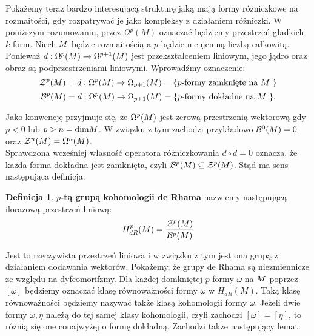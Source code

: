 \documentclass[licencjacka]{pracamgr}
\theoremstyle{definition}
\newtheorem{definition}{Definicja}[section]
\theoremstyle{definition}
\theoremstyle{plain}
\theoremstyle{plain}
\theoremstyle{plain}
\theoremstyle{plain}
\def\M{\ensuremath M}
\begin{document}
Pokażemy teraz bardzo interesującą strukturę jaką mają formy różniczkowe na
rozmaitości, gdy rozpatrywać je jako kompleksy z działaniem różniczki.  W
poniższym rozumowaniu, przez $\Omega^p (M)$ oznaczać będziemy przestrzeń
gładkich $k$-form.  Niech $\M$ będzie rozmaitością a $p$ będzie nieujemną
liczbą całkowitą.  Ponieważ $d: \Omega^p (\M ) \rightarrow \Omega^{p+1}(\M) $
jest przekształceniem liniowym, jego jądro oraz obraz są podprzestrzeniami
liniowymi. Wprowadźmy oznaczenie:
\[
\mathcal{Z}^p ( \M ) =
d: \Omega^{p} (\M ) \rightarrow \Omega_{p+1}(\M) =
\{\text{$p$-formy zamknięte na $\M$ } \}
\]
\[
\mathcal{B}^p ( \M ) =
d: \Omega^{p} (\M ) \rightarrow \Omega_{p+1}(\M) =
\{\text{$p$-formy dokładne na $\M$ } \}.
\]

Jako konwencję przyjmuje się, że $\Omega^{p} ( \M ) $ jest zerową
przestrzenią wektorową gdy $p < 0$ lub $p > n = \text{dim} \M $. W
związku z tym zachodzi przykładowo $\mathcal{B}^0(\M)=0$ oraz
$\mathcal{Z}^n(\M)= \Omega^n(\M)$. \\

Sprawdzona wcześniej własność operatora różniczkowania $d \circ d = 0$ oznacza,
że każda forma dokładna jest zamknięta, czyli
$ \mathcal{B}^p ( \M) \subseteq \mathcal{Z}^p ( \M) $.
Stąd ma sens następująca definicja:

\begin{definition}
  \textbf{$p$-tą grupą kohomologii de Rhama} nazwiemy następującą
  ilorazową przestrzeń liniową:
  \[
  H^{p}_{dR} ( \M ) = \frac {\mathcal{Z}^p ( \M )} {\mathcal{B}^p ( \M )}
  \]
\end{definition}
Jest to rzeczywista przestrzeń liniowa i w związku z tym jest ona
grupą z działaniem dodawania wektorów. Pokażemy, że grupy de Rhama są
niezmiennicze ze względu na dyfeomorifzmy. Dla każdej domkniętej $p$-formy
$\omega$ na $\M$ poprzez $[\omega]$ będziemy oznaczać klasę równoważności
formy $\omega$ w $H_{dR} (M)$. Taką klasę równoważności będziemy nazywać także klasą
kohomologii formy $\omega$. Jeżeli dwie formy $\omega, \eta$ należą do tej samej klasy
kohomologii, czyli zachodzi $[\omega] = [\eta]$, to różnią się one conajwyżej o formę
dokładną. Zachodzi także następujący lemat:
\end{document}
